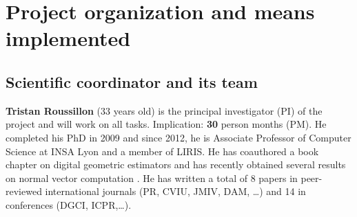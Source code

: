 \section{Project organization and means implemented}
\label{sec:org}

\subsection{Scientific coordinator and its team}


\textbf{Tristan Roussillon} (33 years old) is the principal investigator (PI) of the project
and will work on all tasks. Implication: \textbf{30} person months (PM). 
He completed his PhD in 2009 and since 2012, he is Associate Professor of Computer Science at INSA Lyon
and a member of LIRIS. 
He has coauthored a book chapter on digital geometric estimators \cite{Coeurjolly2012} and
has recently obtained several results on normal vector computation \cite{LPRTCS2016,LPRDGCI2016,LPRJMIV2017}.    
He has written a total of 8 papers in peer-reviewed international journals (PR, CVIU, JMIV, DAM, \ldots) 
and 14 in conferences (DGCI, ICPR,\ldots).

